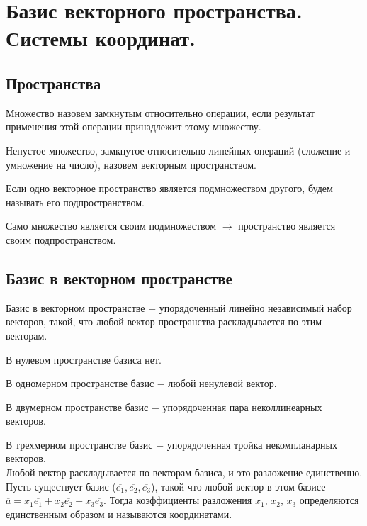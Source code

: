 \section{Базис векторного пространства. Системы координат.}

\subsection{Пространства}

\begin{definition}
	Множество назовем $\textit{замкнутым}$ относительно операции, если результат применения этой операции принадлежит этому множеству.
\end{definition}

\begin{definition}
	Непустое множество, замкнутое относительно линейных операций (сложение и умножение на число), назовем $\textit{векторным пространством}$.
\end{definition}

Если одно векторное пространство является подмножеством другого, будем называть его $\textit{подпространством}$.

Само множество является своим подмножеством $\longrightarrow$ пространство является своим подпространством.


\subsection{Базис в векторном пространстве}

\begin{definition}
	$\textit{Базис в векторном пространстве}$ $-$ упорядоченный линейно независимый набор векторов, такой, что любой вектор пространства раскладывается по этим векторам.
\end{definition}

В нулевом пространстве базиса нет.

В одномерном пространстве базис $-$ любой ненулевой вектор.

В двумерном пространстве базис $-$ упорядоченная пара неколлинеарных векторов.

В трехмерном пространстве базис $-$ упорядоченная тройка некомпланарных векторов.\\

Любой вектор раскладывается по векторам базиса, и это разложение единственно.\\

Пусть существует базис ($\overline{e_1}, \overline{e_2}, \overline{e_3}$), такой что любой вектор в этом базисе $\overline{a} = x_1\overline{e_1} + x_2\overline{e_2} + x_3\overline{e_3}$. Тогда коэффициенты разложения $x_1$, $x_2$, $x_3$ определяются единственным образом и называются $\textit{координатами}$.\\

